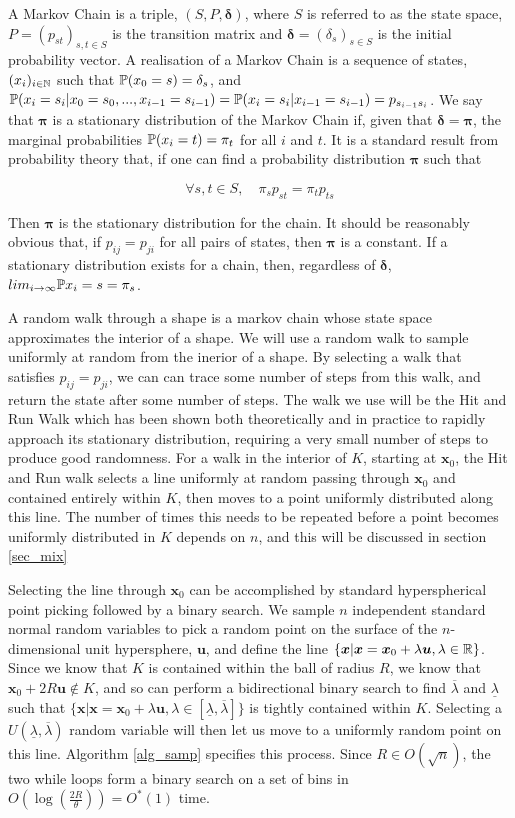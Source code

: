 A Markov Chain is a triple, $(S,P,\bm{\delta})$, where $S$ is referred to as the state space, $P = (p_{st})_{s,t \in S}$ is the transition matrix and $\bm{\delta} = (\delta_s)_{s \in S}$ is the initial probability vector. A realisation of a Markov Chain is a sequence of states, $(x_i)_{i \in \mathbb{N}}$ such that $\mathbb{P} (x_0 = s)=\delta_s$, and $\mathbb{P}(x_i = s_i | x_0 = s_0, ..., x_{i-1} = s_{i-1}) = \mathbb{P} (x_i = s_i | x_{i-1} = s_{i-1})= p_{s_{i-1}s_{i}}$. We say that $\bm{\pi}$ is a stationary distribution of the Markov Chain if, given that $\bm{\delta} = \bm{\pi}$, the marginal probabilities $\mathbb{P}(x_i = t) = \pi_t$ for all $i$ and $t$.  It is a standard result from probability theory that, if one can find a probability distribution $\bm{\pi}$ such that

$$
\forall s,t \in S, \quad \pi_s p_{st} = \pi_t p_{ts}
$$

Then $\bm{\pi}$ is the stationary distribution for the chain. It should be reasonably obvious that, if $p_{ij} = p_{ji}$ for all pairs of states, then $\bm{\pi}$ is a constant. If a stationary distribution exists for a chain, then, regardless of $\bm{\delta}$, $lim_{i-> \infty} \mathbb{P} {x_i = s} = \pi_s$.

A random walk through a shape is a markov chain whose state space approximates the interior of a shape. We will use a random walk to sample uniformly at random from the inerior of a shape. By selecting a walk that satisfies $p_{ij} = p_{ji}$, we can can trace some number of steps from this walk, and return the state after some number of steps. The walk we use will be the Hit and Run Walk %
which has been shown both theoretically and in practice to rapidly approach its stationary distribution, requiring a very small number of steps to produce good randomness. For a walk in the interior of $K$, starting at $\bm{x}_0$, the Hit and Run walk selects a line uniformly at random passing through $\bm{x}_0$ and contained entirely within $K$, then moves to a point uniformly distributed along this line. The number of times this needs to be repeated before a point becomes uniformly distributed in $K$ depends on $n$, and this will be discussed in section \ref{sec_mix}

Selecting the line through $\bm{x}_0$ can be accomplished by standard hyperspherical point picking %
followed by a binary search. We sample $n$ independent standard normal random variables to pick a random point on the surface of the $n$-dimensional unit hypersphere, $\bm{u}$, and define the line $\{\bm{x} | \bm{x} = \bm{x}_0 + \lambda \bm{u}, \lambda \in \mathbb{R} \}$. Since we know that $K$ is contained within the ball of radius $R$, we know that $\bm{x}_0 + 2R\bm{u} \notin K$, and so can perform a bidirectional binary search to find $\overline{\lambda}$ and $\underline{\lambda}$ such that $\{\bm{x} | \bm{x} = \bm{x}_0 + \lambda \bm{u}, \lambda \in [\underline{\lambda}, \overline{\lambda}] \}$ is tightly contained within $K$. Selecting a $U(\underline{\lambda}, \overline{\lambda})$ random variable will then let us move to a uniformly random point on this line. Algorithm \ref{alg_samp} specifies this process. Since $R \in O(\sqrt{n})$, the two while loops form a binary search on a set of bins in $O(\log(\frac{2R}{\theta})) = O^{*}(1)$ time. 

